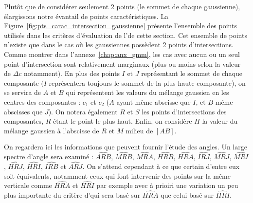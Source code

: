\documentclass[main.tex]{subfiles}
\begin{document}
Plutôt que de considérer seulement 2 points (le sommet de chaque gaussienne), élargissons notre évantail de points caractéristiques. La Figure~\ref{fig:pts_carac_intersection_gaussienne} présente l'ensemble des points utilisés dans les critères d'évaluation de l'\hetero de cette section. Cet ensemble de points n'existe que dans le cas où les gaussiennes possèdent 2 points d'intersections. Comme montrer dans l'annexe~\ref{chap:anx_gmm}, les cas avec aucun ou un seul point d'intersection sont relativement marginaux (plus ou moins selon la valeur de $\Delta c$ notamment). En plus des points $I$ et $J$ représentant le sommet de chaque composante ($I$ représentera toujours le sommet de la plus haute composante), on se servira de $A$ et $B$ qui représentent les valeurs du mélange gaussien en les centres des composantes : $c_1$ et $c_2$ ($A$ ayant même abscisse que $I$, et $B$ même abscisses que $J$). On notera également $R$ et $S$ les points d'intersections des composantes, $R$ étant le point le plus haut. Enfin, on considère $H$ la valeur du mélange gaussien à l'abscisse de $R$ et $M$ milieu de $[AB]$. 


On regardera ici les informations que peuvent fournir l'étude des angles. Un large spectre d'angle sera examiné : $\widehat{ARB}$, $\widehat{MRB}$, $\widehat{MRA}$,  $\widehat{HRB}$, $\widehat{HRA}$, $\widehat{IRJ}$, $\widehat{MRJ}$, $\widehat{MRI}$, $\widehat{HRJ}$, $\widehat{HRI}$, $\widehat{IRB}$ et $\widehat{ARJ}$. 
On s'attend cependant à ce que certain d'entre eux soit équivalents, notamment ceux qui font intervenir des points sur la même verticale comme $\widehat{HRA}$ et $\widehat{HRI}$ par exemple avec à prioiri une variation un peu plus importante du critère d'\hetero qui sera basé sur $\widehat{HRA}$ que celui basé sur $\widehat{HRI}$.
\end{document}
